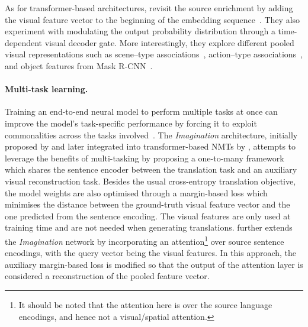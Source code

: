 \documentclass{svjour3}
\begin{document}
As for transformer-based architectures, \cite{gronroos-memad-2018} revisit the source enrichment by adding the visual feature vector to the beginning of the embedding sequence~\citep{huang-attention-based-2016}.
They also experiment with modulating the output probability distribution through a time-dependent visual decoder gate. More interestingly, they explore different pooled visual representations such as scene--type associations~\citep{xiao-sun-2010}, action--type associations~\citep{yao-stanford-2011}, and object features from Mask R-CNN~\citep{he-maskr-2017}. 

\paragraph{\textbf{Multi-task learning.}}
Training an end-to-end neural model to perform multiple tasks at once can improve the model's task-specific performance by forcing it to exploit commonalities across the tasks involved~\citep{caruana1997multitask,dong-multitask-2015,luong2015multi}.
The \textit{Imagination} architecture, initially proposed by
\cite{elliott-imagination-2017} and later integrated into transformer-based NMTs by \cite{helcl-libovick-varis:2018:WMT},
attempts to leverage the benefits of multi-tasking by proposing a one-to-many framework which shares the sentence encoder between the translation task and an auxiliary visual reconstruction task. Besides the usual cross-entropy translation objective, the model weights are also optimised through a margin-based loss which minimises the distance between the ground-truth visual feature vector and the one predicted from the sentence encoding. The visual features are only used at training time and are not needed when generating translations.
\cite{zhou-visual-2018} further extends the \textit{Imagination} network by incorporating an attention\footnote{It should be noted that the attention here is over the source language encodings, and hence not a visual/spatial attention.} over source sentence encodings, with the query vector being the visual features. In this approach, the auxiliary margin-based loss is modified so that the output of the attention layer is considered a reconstruction of the pooled feature vector.
\end{document}

